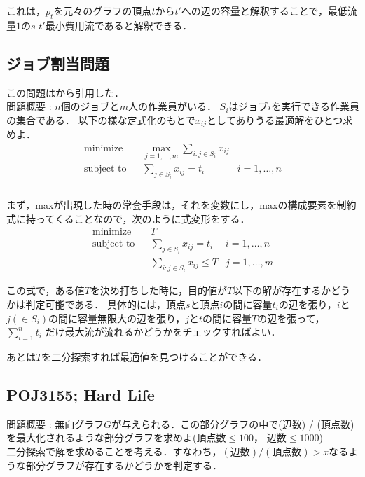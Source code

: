 \documentclass[13pt, a4paper, landscape]{jarticle}
\theoremstyle{nonitalic} %
\begin{document}
これは，$p_t$を元々のグラフの頂点$t$から$t'$への辺の容量と解釈することで，最低流量$1$の$s$-$t'$最小費用流であると解釈できる．

\subsection{ジョブ割当問題}
この問題は\cite{combopt}から引用した．\\

問題概要 : $n$個のジョブと$m$人の作業員がいる．
$S_i$はジョブ$i$を実行できる作業員の集合である．
以下の様な定式化のもとで$x_{ij}$としてありうる最適解をひとつ求めよ．
\begin{align}
  &&&&& \textrm{minimize}   && \max_{j=1,\dots,m} \sum_{i:j \in S_i} x_{ij} \\
  &&&&& \textrm{subject to} && \sum_{j \in S_i} x_{ij} = t_i  & i=1,\dots,n &&&&&\\
\end{align}\\


まず，maxが出現した時の常套手段は，それを変数にし，maxの構成要素を制約式に持ってくることなので，次のように式変形をする．
\begin{align}
  &&&&& \textrm{minimize}   && T \\
  &&&&& \textrm{subject to} && \sum_{j \in S_i} x_{ij} = t_i  & i=1,\dots,n &&&&&\\
  &&&&&                     &&  \sum_{i:j \in S_i} x_{ij} \leq T & j=1,\dots,m
\end{align}

この式で，ある値$T$を決め打ちした時に，目的値が$T$以下の解が存在するかどうかは判定可能である． 具体的には，頂点$s$と頂点$i$の間に容量$t_i$の辺を張り，$i$と$j (\in S_i)$の間に容量無限大の辺を張り，$j$と$t$の間に容量$T$の辺を張って，$\sum_{i=1}^n t_i $ だけ最大流が流れるかどうかをチェックすればよい．

あとは$T$を二分探索すれば最適値を見つけることができる．


\subsection{POJ3155; Hard Life}
問題概要 : 無向グラフ$G$が与えられる．この部分グラフの中で(辺数) / (頂点数)を最大化されるような部分グラフを求めよ(頂点数$\leq 100$， 辺数$\leq 1000$)\\

二分探索で解を求めることを考える．すなわち，$ (\textrm{辺数}) / (\textrm{頂点数})  > x$なるような部分グラフが存在するかどうかを判定する．
\end{document}

